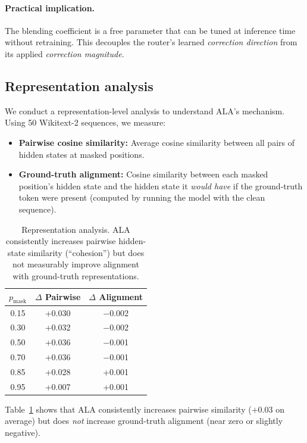 \documentclass{article} %
\newcommand{\pmask}{p_{\text{mask}}}
\begin{document}
\paragraph{Practical implication.}
The blending coefficient is a free parameter that can be tuned at inference time without retraining.
This decouples the router's learned \emph{correction direction} from its applied \emph{correction magnitude}.

\subsection{Representation analysis}

We conduct a representation-level analysis to understand ALA's mechanism.
Using 50 Wikitext-2 sequences, we measure:
\begin{itemize}
    \item \textbf{Pairwise cosine similarity:} Average cosine similarity between all pairs of hidden states at masked positions.
    \item \textbf{Ground-truth alignment:} Cosine similarity between each masked position's hidden state and the hidden state it \emph{would have} if the ground-truth token were present (computed by running the model with the clean sequence).
\end{itemize}

\begin{table}[t]
\begin{center}
\begin{tabular}{ccc}
\toprule
$\pmask$ & $\Delta$ Pairwise & $\Delta$ Alignment \\
\midrule
0.15 & +0.030 & $-$0.002 \\
0.30 & +0.032 & $-$0.002 \\
0.50 & +0.036 & $-$0.001 \\
0.70 & +0.036 & $-$0.001 \\
0.85 & +0.028 & +0.001 \\
0.95 & +0.007 & +0.001 \\
\bottomrule
\end{tabular}
\end{center}
\caption{Representation analysis. ALA consistently increases pairwise hidden-state similarity (``cohesion'') but does not measurably improve alignment with ground-truth representations.}\label{tab:mechinterp}
\end{table}

Table~\ref{tab:mechinterp} shows that ALA consistently increases pairwise similarity ($+0.03$ on average) but does \emph{not} increase ground-truth alignment (near zero or slightly negative).
\end{document}
